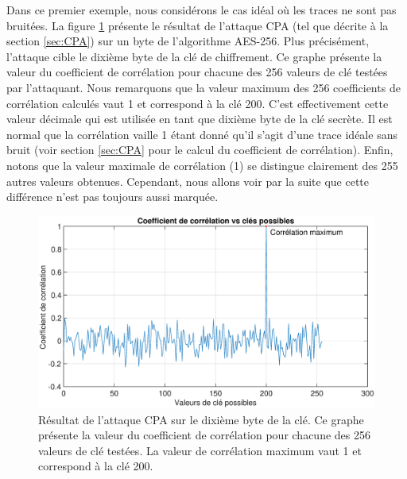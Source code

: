 \documentclass[oneside]{book}
\begin{document}
Dans ce premier exemple, nous considérons le cas idéal où les traces ne sont pas bruitées. La figure \ref{fig:sim_10000_traces} présente le résultat de l'attaque CPA (tel que décrite à la section \ref{sec:CPA}) sur un byte de l'algorithme AES-256. Plus précisément, l'attaque cible le dixième byte de la clé de chiffrement. Ce graphe présente la valeur du coefficient de corrélation pour chacune des 256 valeurs de clé testées par l'attaquant. Nous remarquons que la valeur maximum des 256 coefficients de corrélation calculés vaut 1 et correspond à la clé 200. C'est effectivement cette valeur décimale qui est utilisée en tant que dixième byte de la clé secrète. Il est normal que la corrélation vaille 1 étant donné qu'il s'agit d'une trace idéale sans bruit (voir section \ref{sec:CPA} pour le calcul du coefficient de corrélation). Enfin, notons que la valeur maximale de corrélation (1) se distingue clairement des 255 autres valeurs obtenues. Cependant, nous allons voir par la suite que cette différence n'est pas toujours aussi marquée. 

\begin{figure}[htbp]
    \hspace{-2cm}
    \includegraphics[scale=0.4]{image/sim_10000_traces}
    \caption{Résultat de l'attaque CPA sur le dixième byte de la clé. Ce graphe présente la valeur du coefficient de corrélation pour chacune des 256 valeurs de clé testées. La valeur de corrélation maximum vaut 1 et correspond à la clé 200.}
    \label{fig:sim_10000_traces} 
\end{figure}

\newpage
\end{document}
